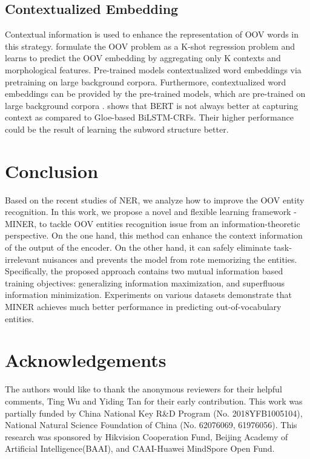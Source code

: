 \documentclass[11pt]{article}
\begin{document}
\subsection{Contextualized Embedding}
Contextual information is used to enhance the representation of OOV words in this strategy. \cite{hu-etal-2019-shot} formulate the OOV problem as a K-shot regression problem and learns to predict the OOV embedding by aggregating only K contexts and morphological features. Pre-trained models contextualized word embeddings via pretraining on large background corpora.
Furthermore, contextualized word embeddings can be provided by the pre-trained models, which are pre-trained on large background corpora \cite{peters-etal-2018-deep,devlin2018bert,liu2019roberta}. \citet{yan-etal-2021-unified-generative} shows that BERT is not always better at capturing context as compared to Gloe-based BiLSTM-CRFs. Their higher performance could be the result of learning the subword structure better.

\section{Conclusion}
Based on the recent studies of NER, we analyze how to improve the OOV entity recognition. In this work, we propose a novel and flexible learning framework - MINER, to tackle OOV entities recognition issue from an information-theoretic perspective. On the one hand, this method can enhance the context information of the output of the encoder. On the other hand, it can safely eliminate task-irrelevant nuisances and prevents the model from rote memorizing the entities. Specifically, the proposed approach contains two mutual information based training objectives: generalizing information maximization, and superfluous information minimization. Experiments on various datasets demonstrate that MINER achieves much better performance in predicting out-of-vocabulary entities.


\section*{Acknowledgements}
The authors would like to thank the anonymous reviewers for their helpful comments, Ting Wu and Yiding Tan for their early contribution. This work was partially funded by China National Key R\&D Program (No. 2018YFB1005104), National Natural Science Foundation of China (No. 62076069, 61976056). This research was sponsored by Hikvision Cooperation Fund, Beijing Academy of Artificial Intelligence(BAAI), and CAAI-Huawei MindSpore Open Fund.
\end{document}
